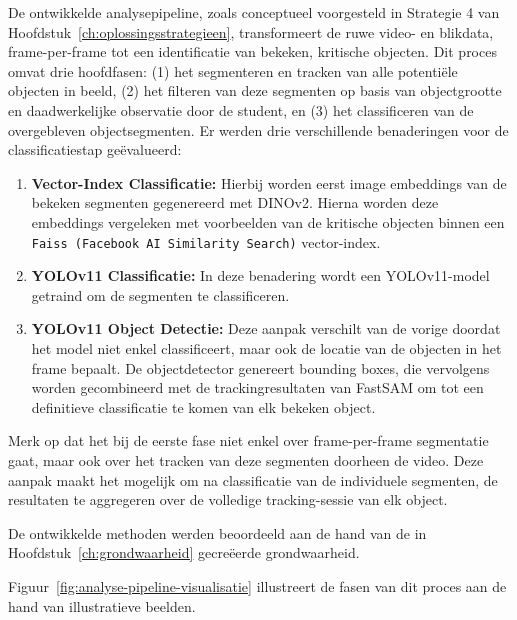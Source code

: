 De ontwikkelde analysepipeline, zoals conceptueel voorgesteld in Strategie 4 van Hoofdstuk~\ref{ch:oplossingsstrategieen}, 
transformeert de ruwe video- en blikdata, frame-per-frame tot een identificatie van bekeken, kritische objecten. 
Dit proces omvat drie hoofdfasen: (1) het segmenteren en tracken van alle potentiële objecten in beeld, 
(2) het filteren van deze segmenten op basis van objectgrootte en daadwerkelijke observatie door de student, en 
(3) het classificeren van de overgebleven objectsegmenten. 
Er werden drie verschillende benaderingen voor de classificatiestap geëvalueerd:
\begin{enumerate}
  \item \textbf{Vector-Index Classificatie:} Hierbij worden eerst image embeddings van de bekeken segmenten gegenereerd met DINOv2.
  Hierna worden deze embeddings vergeleken met voorbeelden van de kritische objecten binnen een\\ \texttt{Faiss (Facebook AI Similarity Search)} vector-index.
  \item \textbf{YOLOv11 Classificatie:} In deze benadering wordt een YOLOv11-model\\ getraind om de segmenten te classificeren.
  \item \textbf{YOLOv11 Object Detectie:} Deze aanpak verschilt van de vorige doordat het model niet enkel classificeert, 
  maar ook de locatie van de objecten in het frame bepaalt. 
  De objectdetector genereert bounding boxes, die vervolgens worden gecombineerd met de trackingresultaten van FastSAM om tot een definitieve classificatie te komen van elk bekeken object.
\end{enumerate}
Merk op dat het bij de eerste fase niet enkel over frame-per-frame segmentatie gaat, maar ook over het tracken van deze segmenten doorheen de video.
Deze aanpak maakt het mogelijk om na classificatie van de individuele segmenten, de resultaten te aggregeren over de volledige tracking-sessie van elk object. 

De ontwikkelde methoden werden beoordeeld aan de hand van de in Hoofdstuk~\ref{ch:grondwaarheid} gecreëerde grondwaarheid.

Figuur~\ref{fig:analyse-pipeline-visualisatie} illustreert de fasen van dit proces aan de hand van illustratieve beelden.

